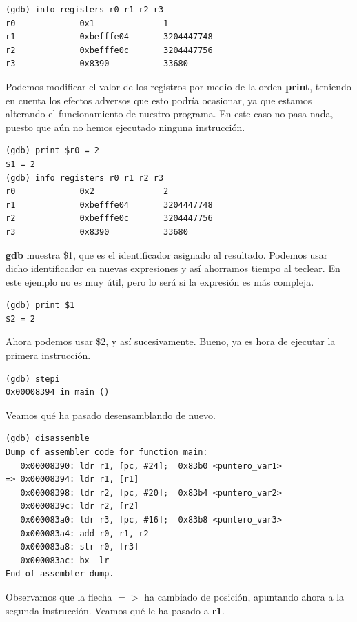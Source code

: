 \begin{lstlisting}
(gdb) info registers r0 r1 r2 r3
r0             0x1              1
r1             0xbefffe04       3204447748
r2             0xbefffe0c       3204447756
r3             0x8390           33680
\end{lstlisting}

Podemos modificar el valor de los registros por medio de la orden
{\bf print}, teniendo en cuenta los efectos adversos que esto podría
ocasionar, ya que estamos alterando el funcionamiento de nuestro
programa. En este caso no pasa nada, puesto que aún no hemos ejecutado
ninguna instrucción.

\begin{lstlisting}
(gdb) print $r0 = 2
$1 = 2
(gdb) info registers r0 r1 r2 r3
r0             0x2              2
r1             0xbefffe04       3204447748
r2             0xbefffe0c       3204447756
r3             0x8390           33680
\end{lstlisting}

{\bf gdb} muestra \$1, que es el identificador asignado al resultado. Podemos
usar dicho identificador en nuevas expresiones y así ahorramos tiempo al teclear.
En este ejemplo no es muy útil, pero lo será si la expresión es más compleja.

\begin{lstlisting}
(gdb) print $1
$2 = 2
\end{lstlisting}

Ahora podemos usar \$2, y así sucesivamente. Bueno, ya es hora de ejecutar la primera
instrucción.

\begin{lstlisting}
(gdb) stepi
0x00008394 in main ()
\end{lstlisting}

Veamos qué ha pasado desensamblando de nuevo.

\begin{lstlisting}
(gdb) disassemble
Dump of assembler code for function main:
   0x00008390: ldr r1, [pc, #24];  0x83b0 <puntero_var1>
=> 0x00008394: ldr r1, [r1]
   0x00008398: ldr r2, [pc, #20];  0x83b4 <puntero_var2>
   0x0000839c: ldr r2, [r2]
   0x000083a0: ldr r3, [pc, #16];  0x83b8 <puntero_var3>
   0x000083a4: add r0, r1, r2
   0x000083a8: str r0, [r3]
   0x000083ac: bx  lr
End of assembler dump.
\end{lstlisting}

Observamos que la flecha {\bf $=>$} ha cambiado de posición, apuntando ahora
a la segunda instrucción. Veamos qué le ha pasado a {\bf r1}.

